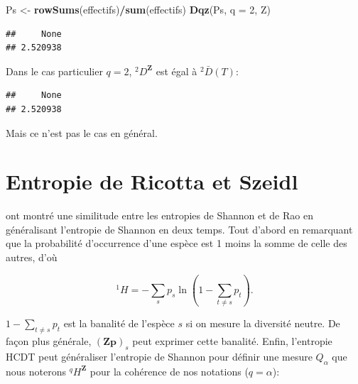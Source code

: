 \documentclass[
  11pt,
  french,
  a4paper,
  extrafontsizes,onecolumn,openright
  ]{memoir}
\newenvironment{Shaded}{\begin{snugshade}}{\end{snugshade}}
\newcommand{\DataTypeTok}[1]{\textcolor[rgb]{0.13,0.29,0.53}{#1}}
\newcommand{\DecValTok}[1]{\textcolor[rgb]{0.00,0.00,0.81}{#1}}
\newcommand{\KeywordTok}[1]{\textcolor[rgb]{0.13,0.29,0.53}{\textbf{#1}}}
\newcommand{\NormalTok}[1]{#1}
\newcommand{\OperatorTok}[1]{\textcolor[rgb]{0.81,0.36,0.00}{\textbf{#1}}}
\newcommand{\StringTok}[1]{\textcolor[rgb]{0.31,0.60,0.02}{#1}}
\begin{document}
\begin{Shaded}
\begin{Highlighting}[]
\NormalTok{Ps <-}\StringTok{ }\KeywordTok{rowSums}\NormalTok{(effectifs)}\OperatorTok{/}\KeywordTok{sum}\NormalTok{(effectifs)}
\KeywordTok{Dqz}\NormalTok{(Ps, }\DataTypeTok{q =} \DecValTok{2}\NormalTok{, Z)}
\end{Highlighting}
\end{Shaded}

\begin{verbatim}
##     None 
## 2.520938
\end{verbatim}

\normalsize

Dans le cas particulier \(q=2\), \(^2\!D^{\mathbf{Z}}\) est égal à \(^{2}\!\bar{D}(T)\):

\scriptsize

\begin{Shaded}
\end{Shaded}

\begin{verbatim}
##     None 
## 2.520938
\end{verbatim}

\normalsize

Mais ce n'est pas le cas en général.

\hypertarget{entropie-de-ricotta-et-szeidl}{%
\section{Entropie de Ricotta et Szeidl}\label{entropie-de-ricotta-et-szeidl}}

\textcite{Ricotta2006b} ont montré une similitude entre les entropies de Shannon et de Rao en généralisant l'entropie de Shannon en deux temps.
Tout d'abord en remarquant que la probabilité d'occurrence d'une espèce est 1 moins la somme de celle des autres, d'où

\begin{equation}
  \label{eq:Ricotta2006bH1}
  ^{1}\!H = -\sum_s{p_s\ln\left(1-\sum_{t\ne s}{p_t}\right)}.
\end{equation}

\(1-\sum_{t\ne s}{p_t}\) est la banalité de l'espèce \(s\) si on mesure la diversité neutre.
De façon plus générale, \({(\mathbf{Zp})}_s\) peut exprimer cette banalité.
Enfin, l'entropie HCDT peut généraliser l'entropie de Shannon pour définir une mesure \(Q_{\alpha}\) que nous noterons \(^q\!H^{\mathbf{Z}}\) pour la cohérence de nos notations (\(q=\alpha\)):
\end{document}
